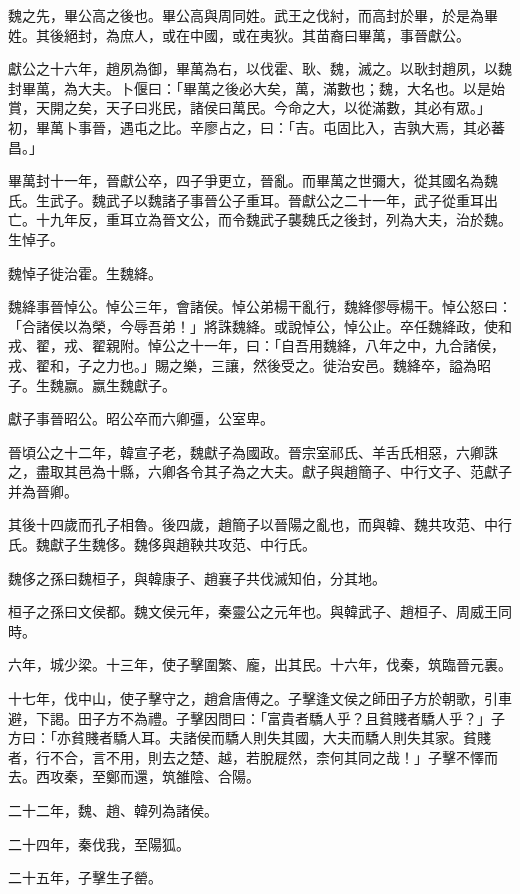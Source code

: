 
\begin{pinyinscope}
魏之先，畢公高之後也。畢公高與周同姓。武王之伐紂，而高封於畢，於是為畢姓。其後絕封，為庶人，或在中國，或在夷狄。其苗裔曰畢萬，事晉獻公。

獻公之十六年，趙夙為御，畢萬為右，以伐霍、耿、魏，滅之。以耿封趙夙，以魏封畢萬，為大夫。卜偃曰：「畢萬之後必大矣，萬，滿數也；魏，大名也。以是始賞，天開之矣，天子曰兆民，諸侯曰萬民。今命之大，以從滿數，其必有眾。」初，畢萬卜事晉，遇屯之比。辛廖占之，曰：「吉。屯固比入，吉孰大焉，其必蕃昌。」

畢萬封十一年，晉獻公卒，四子爭更立，晉亂。而畢萬之世彌大，從其國名為魏氏。生武子。魏武子以魏諸子事晉公子重耳。晉獻公之二十一年，武子從重耳出亡。十九年反，重耳立為晉文公，而令魏武子襲魏氏之後封，列為大夫，治於魏。生悼子。

魏悼子徙治霍。生魏絳。

魏絳事晉悼公。悼公三年，會諸侯。悼公弟楊干亂行，魏絳僇辱楊干。悼公怒曰：「合諸侯以為榮，今辱吾弟！」將誅魏絳。或說悼公，悼公止。卒任魏絳政，使和戎、翟，戎、翟親附。悼公之十一年，曰：「自吾用魏絳，八年之中，九合諸侯，戎、翟和，子之力也。」賜之樂，三讓，然後受之。徙治安邑。魏絳卒，謚為昭子。生魏嬴。嬴生魏獻子。

獻子事晉昭公。昭公卒而六卿彊，公室卑。

晉頃公之十二年，韓宣子老，魏獻子為國政。晉宗室祁氏、羊舌氏相惡，六卿誅之，盡取其邑為十縣，六卿各令其子為之大夫。獻子與趙簡子、中行文子、范獻子并為晉卿。

其後十四歲而孔子相魯。後四歲，趙簡子以晉陽之亂也，而與韓、魏共攻范、中行氏。魏獻子生魏侈。魏侈與趙鞅共攻范、中行氏。

魏侈之孫曰魏桓子，與韓康子、趙襄子共伐滅知伯，分其地。

桓子之孫曰文侯都。魏文侯元年，秦靈公之元年也。與韓武子、趙桓子、周威王同時。

六年，城少梁。十三年，使子擊圍繁、龐，出其民。十六年，伐秦，筑臨晉元裏。

十七年，伐中山，使子擊守之，趙倉唐傅之。子擊逢文侯之師田子方於朝歌，引車避，下謁。田子方不為禮。子擊因問曰：「富貴者驕人乎？且貧賤者驕人乎？」子方曰：「亦貧賤者驕人耳。夫諸侯而驕人則失其國，大夫而驕人則失其家。貧賤者，行不合，言不用，則去之楚、越，若脫屣然，柰何其同之哉！」子擊不懌而去。西攻秦，至鄭而還，筑雒陰、合陽。

二十二年，魏、趙、韓列為諸侯。

二十四年，秦伐我，至陽狐。

二十五年，子擊生子罃。


\end{pinyinscope}
